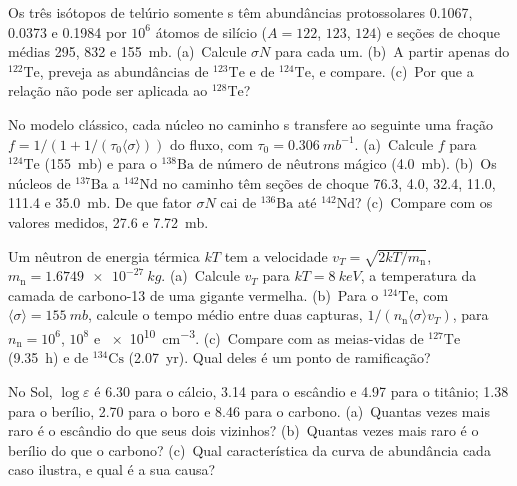 \begin{exercise}[$\star\star$]\label{exo:b3:origin-of-elements:5}
Os três isótopos de telúrio somente s têm abundâncias protossolares
\num{0.1067}, \num{0.0373} e \num{0.1984} por $10^6$ átomos de silício
($A = 122$, $123$, $124$) e seções de choque médias \num{295},
\num{832} e \qty{155}{mb}. (a)~Calcule $\sigma N$ para cada um. (b)~A partir
apenas do $^{122}\mathrm{Te}$, preveja as abundâncias de $^{123}\mathrm{Te}$
e de $^{124}\mathrm{Te}$, e compare. (c)~Por que a relação não pode ser
aplicada ao $^{128}\mathrm{Te}$?
\end{exercise}

\begin{exercise}[$\star\star$]\label{exo:b3:origin-of-elements:6}
No modelo clássico, cada núcleo no caminho s transfere ao seguinte uma fração
$f = 1/(1 + 1/(\tau_0\langle\sigma\rangle))$ do
fluxo, com $\tau_0 = \qty{0.306}{mb^{-1}}$. (a)~Calcule $f$ para
$^{124}\mathrm{Te}$ (\qty{155}{mb}) e para o
$^{138}\mathrm{Ba}$ de número de nêutrons mágico (\qty{4.0}{mb}). (b)~Os núcleos de
$^{137}\mathrm{Ba}$ a $^{142}\mathrm{Nd}$ no caminho têm seções de choque
\num{76.3}, \num{4.0}, \num{32.4}, \num{11.0},
\num{111.4} e \qty{35.0}{mb}. De que fator $\sigma N$ cai de
$^{136}\mathrm{Ba}$ até $^{142}\mathrm{Nd}$? (c)~Compare com os
valores medidos, \num{27.6} e \qty{7.72}{mb}.
\end{exercise}

\begin{exercise}[$\star\star$]\label{exo:b3:origin-of-elements:7}
Um nêutron de energia térmica $kT$ tem a velocidade
$v_T = \sqrt{2kT/m_\mathrm{n}}$, $m_\mathrm{n} = \qty{1.6749e-27}{kg}$.
(a)~Calcule $v_T$ para $kT = \qty{8}{keV}$, a temperatura da
camada de carbono-13 de uma gigante vermelha. (b)~Para o $^{124}\mathrm{Te}$, com
$\langle\sigma\rangle = \qty{155}{mb}$, calcule o tempo médio entre
duas capturas, $1/(n_\mathrm{n}\langle\sigma\rangle v_T)$, para
$n_\mathrm{n} = 10^6$, $10^8$ e \qty{e10}{cm^{-3}}. (c)~Compare com as
meias-vidas de $^{127}\mathrm{Te}$ (\qty{9.35}{h}) e de
$^{134}\mathrm{Cs}$ (\qty{2.07}{yr}). Qual deles é um ponto de ramificação?
\end{exercise}

\begin{exercise}[$\star\star$]\label{exo:b3:origin-of-elements:8}
No Sol, $\log\varepsilon$ é \num{6.30} para o cálcio, \num{3.14} para
o escândio e \num{4.97} para o titânio; \num{1.38} para o berílio,
\num{2.70} para o boro e \num{8.46} para o carbono. (a)~Quantas vezes
mais raro é o escândio do que seus dois vizinhos? (b)~Quantas vezes mais raro é
o berílio do que o carbono? (c)~Qual característica da curva
de abundância cada caso ilustra, e qual é a sua causa?
\end{exercise}

